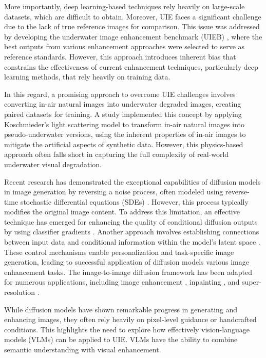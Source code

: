 \documentclass[3p,12pt,authoryear]{elsarticle}
\begin{document}
More importantly, deep learning-based techniques rely heavily on large-scale datasets, which are difficult to obtain. Moreover, UIE faces a significant challenge due to the lack of true reference images for comparison. This issue was addressed by developing the underwater image enhancement benchmark (UIEB) \cite{8917818}, where the best outputs from various enhancement approaches were selected to serve as reference standards. However, this approach introduces inherent bias that constrains the effectiveness of current enhancement techniques, particularly deep learning methods, that rely heavily on training data.

In this regard, a promising approach to overcome UIE challenges involves converting in-air natural images into underwater degraded images, creating paired datasets for training. A study \cite{DU2025125271} implemented this concept by applying Koschmieder's light scattering model to transform in-air natural images into pseudo-underwater versions, using the inherent properties of in-air images to mitigate the artificial aspects of synthetic data. However, this physics-based approach often falls short in capturing the full complexity of real-world underwater visual degradation.

Recent research has demonstrated the exceptional capabilities of diffusion models in image generation by reversing a noise process, often modeled using reverse-time stochastic differential equations (SDEs) \cite{gal2023an}. However, this process typically modifies the original image content. To address this limitation, an effective technique has emerged for enhancing the quality of conditional diffusion outputs by using classifier gradients \cite{song2021scorebased, ho2021classifierfree}. Another approach involves establishing connections between input data and conditional information within the model's latent space \cite{9887996, 9879075}. These control mechanisms enable personalization and task-specific image generation, leading to successful application of diffusion models various image enhancement tasks. The image-to-image diffusion framework \cite{9887996} has been adapted for numerous applications, including image enhancement \cite{DU2025125271, 10.1145/3581783.3612378}, inpainting \cite{10.1145/3528233.3530757}, and super-resolution \cite{9887996}.

While diffusion models have shown remarkable progress in generating and enhancing images, they often rely heavily on pixel-level guidance or handcrafted conditions. This highlights the need to explore how effectively vision-language models (VLMs) can be applied to UIE. VLMs have the ability to combine semantic understanding with visual enhancement.
\end{document}
